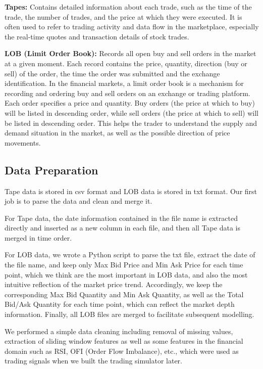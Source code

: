 \documentclass[conference]{IEEEtran}
\begin{document}
\textbf{Tapes:} Contains detailed information about each trade, such as the time of the trade, the number of trades, and the price at which they were executed. It is often used to refer to trading activity and data flow in the marketplace, especially the real-time quotes and transaction details of stock trades.

\textbf{LOB (Limit Order Book):} Records all open buy and sell orders in the market at a given moment. Each record contains the price, quantity, direction (buy or sell) of the order, the time the order was submitted and the exchange identification. In the financial markets, a limit order book is a mechanism for recording and ordering buy and sell orders on an exchange or trading platform. Each order specifies a price and quantity. Buy orders (the price at which to buy) will be listed in descending order, while sell orders (the price at which to sell) will be listed in descending order. This helps the trader to understand the supply and demand situation in the market, as well as the possible direction of price movements.

\subsection{Data Preparation}
Tape data is stored in csv format and LOB data is stored in txt format. Our first job is to parse the data and clean and merge it.

For Tape data, the date information contained in the file name is extracted directly and inserted as a new column in each file, and then all Tape data is merged in time order.

For LOB data, we wrote a Python script to parse the txt file, extract the date of the file name, and keep only Max Bid Price and Min Ask Price for each time point, which we think are the most important in LOB data, and also the most intuitive reflection of the market price trend. Accordingly, we keep the corresponding Max Bid Quantity and Min Ask Quantity, as well as the Total Bid/Ask Quantity for each time point, which can reflect the market depth information. Finally, all LOB files are merged to facilitate subsequent modelling.

We performed a simple data cleaning including removal of missing values, extraction of sliding window features as well as some features in the financial domain such as RSI, OFI (Order Flow Imbalance), etc., which were used as trading signals when we built the trading simulator later.
\end{document}
